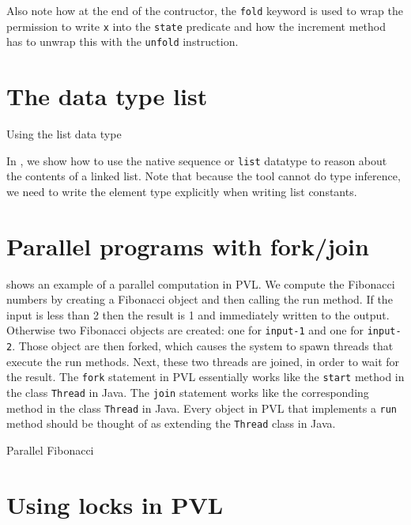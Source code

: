 Also note how at the end of the contructor,
the \lstinline+fold+ keyword is used to wrap the permission
to write \lstinline+x+ into the \lstinline+state+ predicate and how the increment
method has to unwrap this with the \lstinline+unfold+ instruction.

\section{The data type list}\label{sec:list}
\label{list examples}

\begin{listing}

\caption{Using the list data type}
\label{list}
\end{listing}

In , we show how to use the native sequence or \lstinline+list+ datatype
to reason about the contents of a linked list. Note that because the tool
cannot do type inference, we need to write the element type explicitly
when writing list constants.

\section{Parallel programs with fork/join}\label{sec:forkjoin}


 shows an example of a parallel computation
in PVL. We compute the Fibonacci numbers by creating a Fibonacci object
and then calling the run method. If the input is less than 2 then the result is
1 and immediately written to the output. Otherwise two Fibonacci objects are created: one for \lstinline+input-1+ and
one for \lstinline+input-2+. Those object are then forked, which causes the system
to spawn threads that execute the run methods. Next, these two threads are joined, in order to wait for the result.
The \lstinline+fork+ statement in PVL essentially works like the \lstinline+start+ method in the
class \lstinline+Thread+ in Java. The \lstinline+join+ statement works like the corresponding
method in the class \lstinline+Thread+ in Java. Every object in PVL that implements a \lstinline+run+ method
should be thought of as extending the \lstinline+Thread+ class in Java.

\begin{listing}

\caption{Parallel Fibonacci}
\label{fibonacci}
\end{listing}

\section{Using locks in PVL}

